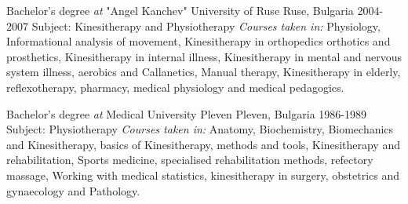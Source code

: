 \cventry
{Bachelor's degree \textit{at} "Angel Kanchev" University of Ruse}
{Ruse, Bulgaria 2004-2007}
{
Subject: Kinesitherapy and Physiotherapy
\newline
\textit{Courses taken in:} Physiology, Informational analysis of movement, Kinesitherapy in orthopedics orthotics and prosthetics, Kinesitherapy in internal illness, Kinesitherapy in mental and nervous system illness, aerobics and Callanetics, Manual therapy, Kinesitherapy in elderly, reflexotherapy, pharmacy, medical physiology and medical pedagogics.
}

\vspace{+3mm}
\cventry
{Bachelor's degree \textit{at} Medical University Pleven}
{Pleven, Bulgaria 1986-1989}
{
Subject: Physiotherapy
\newline
\textit{Courses taken in:} Anatomy, Biochemistry, Biomechanics and Kinesitherapy, basics of Kinesitherapy, methods and tools, Kinesitherapy and rehabilitation, Sports medicine, specialised rehabilitation methods, refectory massage, Working with medical statistics, kinesitherapy in surgery, obstetrics and gynaecology and Pathology.
}
